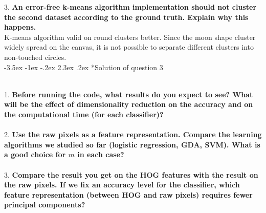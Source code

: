 \documentclass[12pt]{article}
\makeatletter
\renewcommand\section{\@startsection {section}{1}{\z@}%
	{-3.5ex \@plus -1ex \@minus -.2ex}%
	{2.3ex \@plus.2ex}%
	{\normalfont\large\bfseries}}%
\makeatother
\begin{document}
	\noindent
	3. \textbf{An error-free k-means algorithm implementation should not cluster the second dataset according to the ground truth. Explain why this happens.}\\
	\noindent
	K-means algorithm valid on round clusters better. Since the moon shape cluster widely spread on the canvas, it is not possible to separate different clusters into non-touched circles.\\
	\section*{Solution of question 3}
	\noindent
	\\
	1. \textbf{Before running the code, what results do you expect to see? What will be the effect of dimensionality reduction on the accuracy and on the computational time (for each classifier)?}\\
	\\
	2. \textbf{Use the raw pixels as a feature representation. Compare the learning algorithms we studied so far (logistic regression, GDA, SVM). What is a good choice for $m$ in each case?}\\
	\\
	3. \textbf{Compare the result you get on the HOG features with the result on the raw pixels. If we fix an accuracy level for the classifier, which feature representation (between HOG and raw pixels) requires fewer principal components?}\\
	\\
	
\end{document}
